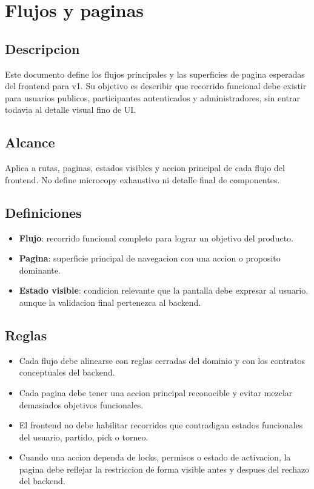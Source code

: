 \section{Flujos y paginas}

\subsection{Descripcion}

Este documento define los flujos principales y las superficies de pagina esperadas del frontend para v1. Su objetivo es describir que recorrido funcional debe existir para usuarios publicos, participantes autenticados y administradores, sin entrar todavia al detalle visual fino de UI.

\subsection{Alcance}

Aplica a rutas, paginas, estados visibles y accion principal de cada flujo del frontend. No define microcopy exhaustivo ni detalle final de componentes.

\subsection{Definiciones}

\begin{itemize}
  \item \textbf{Flujo}: recorrido funcional completo para lograr un objetivo del producto.
  \item \textbf{Pagina}: superficie principal de navegacion con una accion o proposito dominante.
  \item \textbf{Estado visible}: condicion relevante que la pantalla debe expresar al usuario, aunque la validacion final pertenezca al backend.
\end{itemize}

\subsection{Reglas}

\begin{itemize}
  \item Cada flujo debe alinearse con reglas cerradas del dominio y con los contratos conceptuales del backend.
  \item Cada pagina debe tener una accion principal reconocible y evitar mezclar demasiados objetivos funcionales.
  \item El frontend no debe habilitar recorridos que contradigan estados funcionales del usuario, partido, pick o torneo.
  \item Cuando una accion dependa de locks, permisos o estado de activacion, la pagina debe reflejar la restriccion de forma visible antes y despues del rechazo del backend.
\end{itemize}

